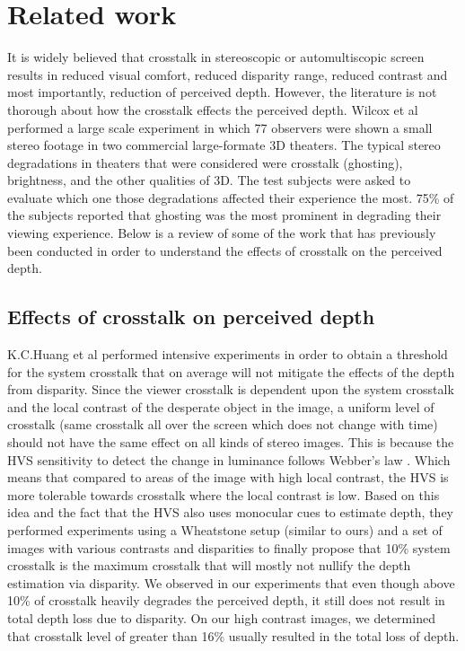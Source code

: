 \chapter{Related work}
\label{chap:relatedWork}
It is widely believed that crosstalk in stereoscopic or automultiscopic screen results in reduced visual comfort, reduced disparity range, reduced contrast and most importantly, reduction of perceived depth. However, the literature is not thorough about how the  crosstalk effects the perceived depth. Wilcox et al \cite{wilcox2003determinants} performed a large scale experiment in which 77 observers were shown a small stereo footage in two commercial large-formate 3D theaters. The typical stereo degradations in theaters that were considered were crosstalk (ghosting), brightness, and the other qualities of 3D. The test subjects were asked to evaluate which one those degradations affected their experience the most. 75\% of the subjects reported that ghosting was the most prominent in degrading their viewing experience. Below is a review of some of the work that has previously been conducted in order to understand the effects of crosstalk on the perceived depth.

\section{Effects of crosstalk on perceived depth}
K.C.Huang et al \cite{huang2003crosstalk} performed intensive experiments in order to obtain a threshold for the system crosstalk that on average will not mitigate the effects of the depth from disparity. Since the viewer crosstalk is dependent upon the system crosstalk and the local contrast of the desperate object in the image, a uniform level of crosstalk (same crosstalk all over the screen which does not change with time) should not have the same effect on all kinds of stereo images. This is because the HVS sensitivity to detect the change in luminance follows Webber's law \cite{webber}. Which means that compared to areas of the image with high local contrast, the HVS is more tolerable towards crosstalk where the local contrast is low. Based on this idea and the fact that the HVS also uses monocular cues to estimate depth, they performed experiments using a Wheatstone setup (similar to ours) and a set of images with various contrasts and disparities to finally propose that 10\% system crosstalk is the maximum crosstalk that will mostly not nullify the depth estimation via disparity. We observed in our experiments that even though above 10\% of crosstalk heavily degrades the perceived depth, it still does not result in total depth loss due to disparity. On our high contrast images, we determined that crosstalk level of greater than 16\% usually resulted in the total loss of depth.


